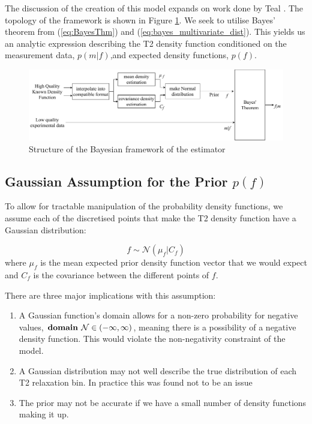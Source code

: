 The discussion of the creation of this model expands on work done by Teal \cite{paulTeal_NMRBayes}. The topology of the framework is shown in Figure \ref{fig:bayesian_framework}. We seek to utilise Bayes' theorem from (\ref{eq:BayesThm}) and (\ref{eq:bayes_multivariate_dist}). This yields us an analytic expression describing the T2 density function conditioned on the measurement data, $p(m|f)$,and expected density functions, $p(f)$.


\begin{figure}[h]
    \centering
    \includegraphics[width=\textwidth]{design/BayesianTechniqueTopology.pdf}
    \caption{Structure of the Bayesian framework of the estimator}
    \label{fig:bayesian_framework}
\end{figure}

\subsection{Gaussian Assumption for the Prior $p(f)$} \label{subsec:GaussianPriorAssumption}

To allow for tractable manipulation of the probability density functions, we assume each of the discretised points that make the T2 density function have a Gaussian distribution:

\begin{equation}
f \sim \mathcal{N}(\mu_f | C_f)
\label{eq:prior_density_normal}
\end{equation}
where $\mu_f$ is the mean expected prior density function vector that we would expect and $C_f$ is the covariance between the different points of $f$.



There are three major implications with this assumption:
\begin{enumerate}
\item A Gaussian function's domain allows for a non-zero probability for negative values, $ \text{\textbf{domain }} \mathcal{N} \in (-\infty, \infty) $, meaning there is a possibility of a negative density function. This would violate the non-negativity constraint of the model.
\item A Gaussian distribution may not well describe the true distribution of each T2 relaxation bin. In practice this was found not to be an issue
\item The prior may not be accurate if we have a small number of density functions making it up.
\end{enumerate}

